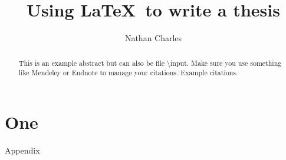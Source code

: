 \documentclass [12 pt, letterpaper]{report}
\title{Using \LaTeX \ to write a thesis}
\author{Nathan Charles}
\begin{document}
\begin{spacing}{2.0}


\dedication{Thesis students using \LaTeX}


\frontmatter

\begin{abstract}
\noindent This is an example abstract but can also be file \textbackslash input.
Make sure you use something like Mendeley or Endnote to manage your citations.
Example citations\cite{Vari}\cite{Mori2008}.
%
\end{abstract}

\blinddocument 

\end{spacing}

\renewcommand{\bibname}{References}




\appendix
{}

\chapter{One}
Appendix
\end{document}
